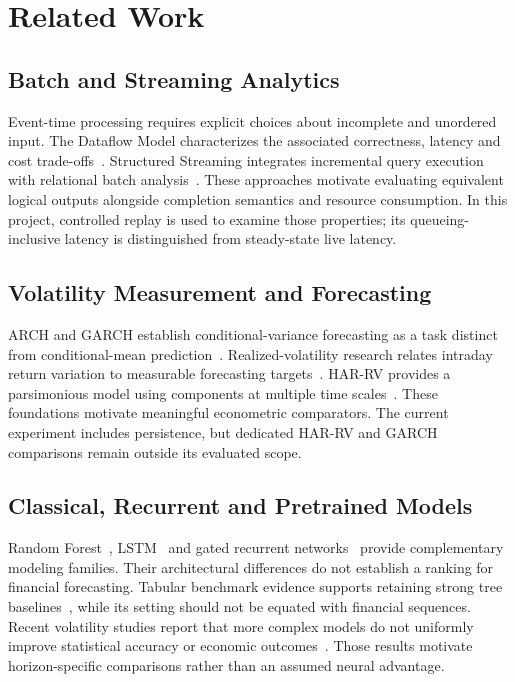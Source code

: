 \section{Related Work}
\label{sec:related-work}

\subsection{Batch and Streaming Analytics}
Event-time processing requires explicit choices about incomplete and unordered input. The Dataflow Model characterizes the associated correctness, latency and cost trade-offs~\cite{akidau2015dataflow}. Structured Streaming integrates incremental query execution with relational batch analysis~\cite{armbrust2018structured}. These approaches motivate evaluating equivalent logical outputs alongside completion semantics and resource consumption. In this project, controlled replay is used to examine those properties; its queueing-inclusive latency is distinguished from steady-state live latency.

\subsection{Volatility Measurement and Forecasting}
ARCH and GARCH establish conditional-variance forecasting as a task distinct from conditional-mean prediction~\cite{engle1982arch,bollerslev1986garch}. Realized-volatility research relates intraday return variation to measurable forecasting targets~\cite{andersen2003realized}. HAR-RV provides a parsimonious model using components at multiple time scales~\cite{corsi2009har}. These foundations motivate meaningful econometric comparators. The current experiment includes persistence, but dedicated HAR-RV and GARCH comparisons remain outside its evaluated scope.

\subsection{Classical, Recurrent and Pretrained Models}
Random Forest~\cite{breiman2001forest}, LSTM~\cite{hochreiter1997lstm} and gated recurrent networks~\cite{cho2014gru} provide complementary modeling families. Their architectural differences do not establish a ranking for financial forecasting. Tabular benchmark evidence supports retaining strong tree baselines~\cite{grinsztajn2022tabular}, while its setting should not be equated with financial sequences. Recent volatility studies report that more complex models do not uniformly improve statistical accuracy or economic outcomes~\cite{branco2024linear,diaz2024volatility}. Those results motivate horizon-specific comparisons rather than an assumed neural advantage.


